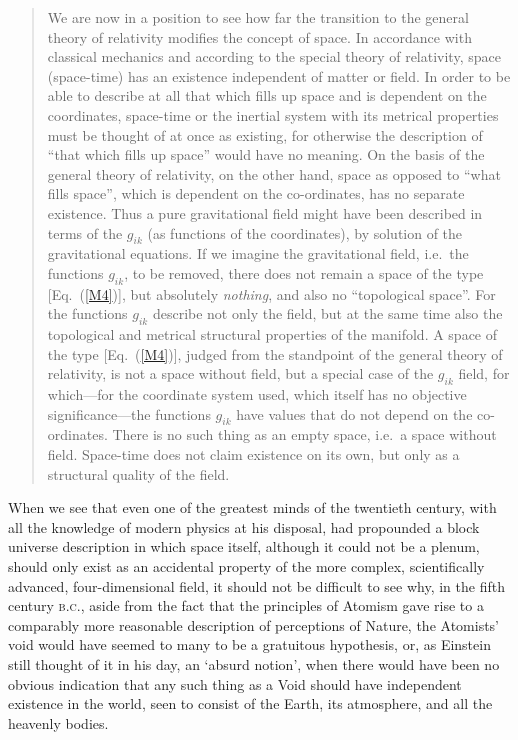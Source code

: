 \begin{quotation}
We are now in a position to see how far the transition to the general theory of relativity modifies the concept of space. In accordance with classical mechanics and according to the special theory of relativity, space (space-time) has an existence independent of matter or field. In order to be able to describe at all that which fills up space and is dependent on the coordinates, space-time or the inertial system with its metrical properties must be thought of at once as existing, for otherwise the description of ``that which fills up space'' would have no meaning. On the basis of the general theory of relativity, on the other hand, space as opposed to ``what fills space'', which is dependent on the co-ordinates, has no separate existence. Thus a pure gravitational field might have been described in terms of the $g_{ik}$ (as functions of the coordinates), by solution of the gravitational equations. If we imagine the gravitational field, i.e.~the functions $g_{ik}$, to be removed, there does not remain a space of the type [Eq.~(\ref{M4})], but absolutely \textit{nothing}, and also no ``topological space''. For the functions $g_{ik}$ describe not only the field, but at the same time also the topological and metrical structural properties of the manifold. A space of the type [Eq.~(\ref{M4})], judged from the standpoint of the general theory of relativity, is not a space without field, but a special case of the $g_{ik}$ field, for which---for the coordinate system used, which itself has no objective significance---the functions $g_{ik}$ have values that do not depend on the co-ordinates. There is no such thing as an empty space, i.e.~a space without field. Space-time does not claim existence on its own, but only as a structural quality of the field.
\end{quotation}

When we see that even one of the greatest minds of the twentieth century, with all the knowledge of modern physics at his disposal, had propounded a block universe description in which space itself, although it could not be a plenum, should only exist as an accidental property of the more complex, scientifically advanced, four-dimensional field, it should not be difficult to see why, in the fifth century \textsc{b.c.}, aside from the fact that the principles of Atomism gave rise to a comparably more reasonable description of perceptions of Nature, the Atomists' void would have seemed to many to be a gratuitous hypothesis, or, as Einstein still thought of it in his day, an `absurd notion', when there would have been no obvious indication that any such thing as a Void should have independent existence in the world, seen to consist of the Earth, its atmosphere, and all the heavenly bodies. 

